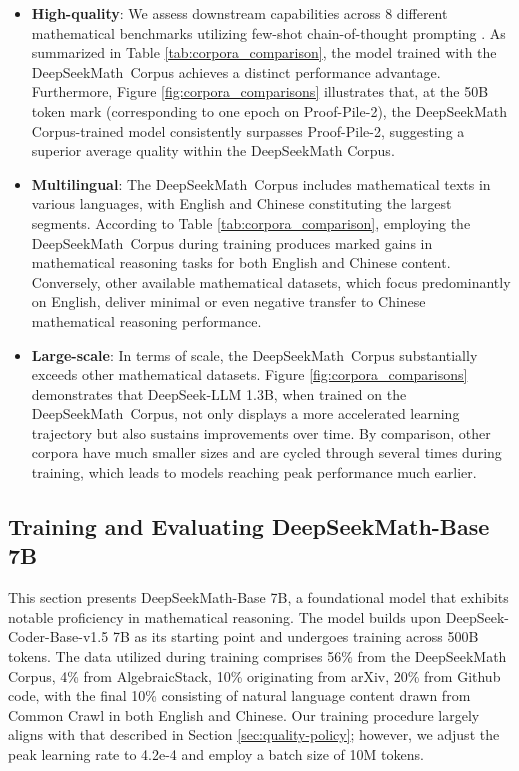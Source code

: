 \begin{itemize}[topsep=0pt]
\begin{itemize}[topsep=0pt]
    \item \textbf{High-quality}:
    We assess downstream capabilities across 8 different mathematical benchmarks utilizing few-shot chain-of-thought prompting \cite{cot}. As summarized in Table \ref{tab:corpora_comparison}, the model trained with the DeepSeekMath~Corpus achieves a distinct performance advantage. Furthermore, Figure \ref{fig:corpora_comparisons} illustrates that, at the 50B token mark (corresponding to one epoch on Proof-Pile-2), the DeepSeekMath Corpus-trained model consistently surpasses Proof-Pile-2, suggesting a superior average quality within the DeepSeekMath Corpus. 
    \item \textbf{Multilingual}:
    The DeepSeekMath~Corpus includes mathematical texts in various languages, with English and Chinese constituting the largest segments. According to Table \ref{tab:corpora_comparison}, employing the DeepSeekMath~Corpus during training produces marked gains in mathematical reasoning tasks for both English and Chinese content. Conversely, other available mathematical datasets, which focus predominantly on English, deliver minimal or even negative transfer to Chinese mathematical reasoning performance.
    \item \textbf{Large-scale}:
    In terms of scale, the DeepSeekMath~Corpus substantially exceeds other mathematical datasets. Figure \ref{fig:corpora_comparisons} demonstrates that DeepSeek-LLM 1.3B, when trained on the DeepSeekMath~Corpus, not only displays a more accelerated learning trajectory but also sustains improvements over time. By comparison, other corpora have much smaller sizes and are cycled through several times during training, which leads to models reaching peak performance much earlier.
\end{itemize}

\subsection{Training and Evaluating DeepSeekMath-Base 7B}

This section presents DeepSeekMath-Base 7B, a foundational model that exhibits notable proficiency in mathematical reasoning. The model builds upon DeepSeek-Coder-Base-v1.5 7B \citep{deepseek-coder} as its starting point and undergoes training across 500B tokens. The data utilized during training comprises 56\% from the DeepSeekMath Corpus, 4\% from AlgebraicStack, 10\% originating from arXiv, 20\% from Github code, with the final 10\% consisting of natural language content drawn from Common Crawl in both English and Chinese. Our training procedure largely aligns with that described in Section \ref{sec:quality-policy}; however, we adjust the peak learning rate to 4.2e-4 and employ a batch size of 10M tokens.


\end{itemize}
